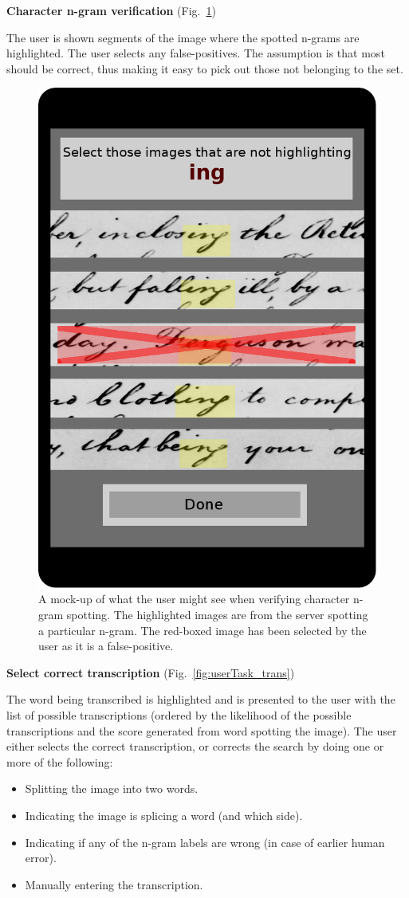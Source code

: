 \documentclass[ms]{byuprop}
\begin{document}
{\setlength{\parindent}{0cm}
\textbf{Character n-gram verification} (Fig.~\ref{fig:userTask_spot})

\begin{addmargin}[3em]{3em}
The user is shown segments of the image where the spotted n-grams are highlighted. The user selects any false-positives. The assumption is that most should be correct, thus making it easy to pick out those not belonging to the set.
\\[.5cm]
\end{addmargin}

\begin{figure}
    \centering
    \includegraphics[width=.4\textwidth]{userTask_spot}
    \caption{A mock-up of what the user might see when verifying character n-gram spotting. The highlighted images are from the server spotting a particular n-gram. The red-boxed image has been selected by the user as it is a false-positive.}
    \label{fig:userTask_spot}
\end{figure}

\textbf{Select correct transcription} (Fig.~\ref{fig:userTask_trans})

\begin{addmargin}[3em]{3em}
The word being transcribed is highlighted and is presented to the user with the list of possible transcriptions (ordered by the likelihood of the possible transcriptions and the score generated from word spotting the image). The user either selects the correct transcription, or corrects the search by doing one or more of the following:
\begin{itemize}
    \item Splitting the image into two words.
    \item Indicating the image is splicing a word (and which side).
    \item Indicating if any of the n-gram labels are wrong (in case of earlier human error).
    \item Manually entering the transcription.
\end{itemize}

\end{addmargin}
}
\end{document}
